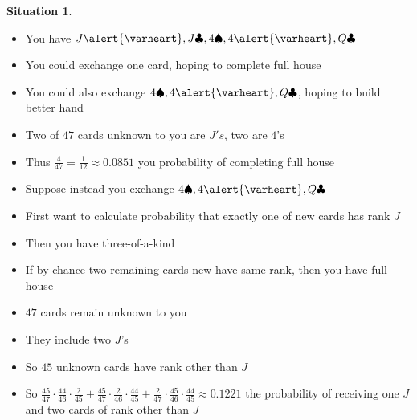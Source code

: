 \documentclass[handout]{beamer}
\theoremstyle{definition}
\newtheorem{situation}{Situation}
\newcommand{\hs}{\alert{\varheart}}
\newcommand{\s}{\spadesuit}
\newcommand{\cs}{\clubsuit}
\begin{document}
\begin{frame}
\begin{situation}
\begin{itemize}
\item You have $J\hs,J\cs,4\s,4\hs,Q\cs$
\item You could exchange one card, hoping to complete full house
\item You could also exchange $4\s,4\hs,Q\cs$, hoping to build better hand
\end{itemize}
\end{situation}
\begin{itemize}
\item Two of $47$ cards unknown to you are $J's$, two are $4$'s
\item Thus $\frac{4}{47}=\frac{1}{12}\approx 0.0851$ you probability
of completing full house
\end{itemize}
\end{frame}

\begin{frame}
\begin{itemize}
\item Suppose instead you exchange $4\s,4\hs,Q\cs$
\item First want to calculate probability that exactly one of new cards
has rank $J$
\item Then you have three-of-a-kind
\item If by chance two remaining cards new have same rank,
then you have full house
\item $47$ cards remain unknown to you
\item They include two $J$'s
\item So $45$ unknown cards have rank other than $J$
\item So $\frac{45}{47}\cdot\frac{44}{46}\cdot\frac{2}{45}
+\frac{45}{47}\cdot\frac{2}{46}\cdot\frac{44}{45}
+\frac{2}{47}\cdot\frac{45}{46}\cdot\frac{44}{45}\approx 0.1221$
the probability of receiving one $J$ and two cards of rank other than $J$
\end{itemize}
\end{frame}
\end{document}
